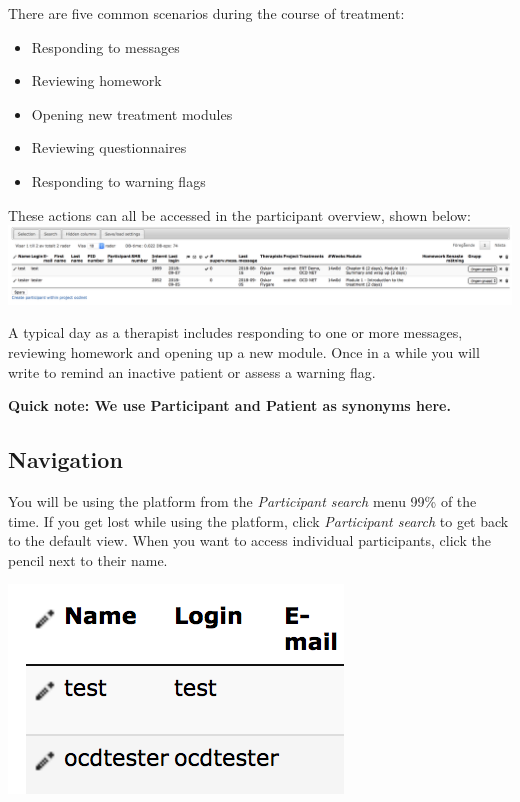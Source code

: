 \documentclass[]{book}
\providecommand{\tightlist}{%
  \setlength{\itemsep}{0pt}\setlength{\parskip}{0pt}}
\theoremstyle{definition}
\theoremstyle{definition}
\theoremstyle{definition}
\theoremstyle{remark}
\begin{document}
There are five common scenarios during the course of treatment:

\begin{itemize}
\tightlist
\item
  Responding to messages
\item
  Reviewing homework
\item
  Opening new treatment modules
\item
  Reviewing questionnaires
\item
  Responding to warning flags
\end{itemize}

These actions can all be accessed in the participant overview, shown
below: \includegraphics{images/participant-overview.png}

A typical day as a therapist includes responding to one or more
messages, reviewing homework and opening up a new module. Once in a
while you will write to remind an inactive patient or assess a warning
flag.

\textbf{Quick note: We use Participant and Patient as synonyms here.}

\hypertarget{navigation}{%
\subsection{Navigation}\label{navigation}}

You will be using the platform from the \emph{Participant search} menu
99\% of the time. If you get lost while using the platform, click
\emph{Participant search} to get back to the default view. When you want
to access individual participants, click the pencil next to their name.

\includegraphics{images/pencil.png}
\end{document}
